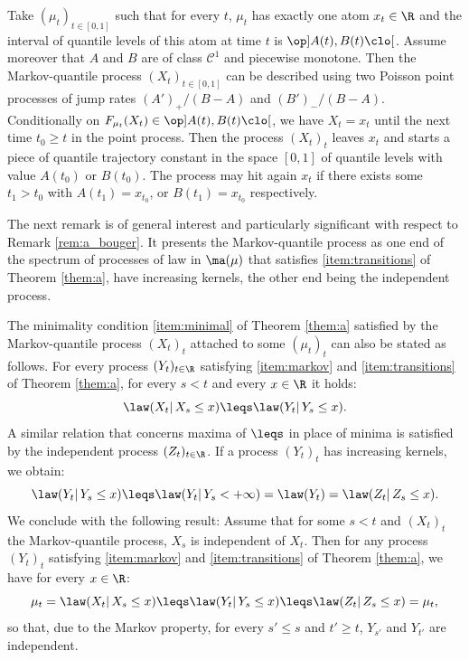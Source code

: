 
\begin{ex}\label{ex:swimming_atom}
Take $(\mu_t)_{t\in{[0,1]}}$ such that for every $t$, $\mu_t$ has exactly one atom $x_t\in \R$ and the interval of quantile levels of this atom at time $t$ is $\op]A(t),B(t)\clo[$. Assume moreover that $A$ and $B$ are of class $\mathcal{C}^1$ and piecewise monotone. Then the Markov-quantile process $(X_t)_{t\in [0,1]}$ can be described using two Poisson point processes of jump rates $(A')_+/(B-A)$ and $(B')_-/(B-A)$. Conditionally on $F_{\mu_t}(X_t)\in \op]A(t), B(t)\clo[$, we have $X_t=x_t$ until the next time $t_0\geq t$ in the point process. Then the process $(X_t)_t$ leaves $x_t$ and starts a piece of quantile trajectory constant in the space $[0,1]$ of quantile levels with value $A(t_0)$ or $B(t_0)$. The process may hit again $x_t$ if there exists some $t_1>t_0$ with $A(t_1)=x_{t_0}$, or $B(t_1)=x_{t_0}$ respectively.
\end{ex}

The next remark is of general interest and particularly significant with respect to Remark \ref{rem:a_bouger}. It presents the Markov-quantile process as one end of the spectrum of processes of law in $\ma(\mu)$ that satisfies \eqref{item:transitions} of Theorem \ref{them:a}, \ie have increasing kernels, the other end being the independent process.

\begin{rem}\label{rem:a_bouger}
The minimality condition \eqref{item:minimal} of Theorem \ref{them:a} satisfied by the Markov-quantile process $(X_t)_t$ attached to some $(\mu_t)_t$ can also be stated as follows. For every process $(Y_t)_{t\in \R}$ satisfying \eqref{item:markov} and \eqref{item:transitions} of Theorem \ref{them:a}, for every $s<t$ and every $x\in \R$ it holds:
\[
\law(X_t|\,X_s\leq x)\leqs \law(Y_t|\,Y_s\leq x).
\]
A similar relation that concerns maxima of $\leqs$ in place of minima is satisfied by the independent process $(Z_t)_{t\in \R}$. If a process $(Y_t)_t$ has increasing kernels, we obtain:
\[\law(Y_t|\,Y_s\leq x)\leqs \law(Y_t|\,Y_s< +\infty)=\law(Y_t)=\law(Z_t|\,Z_s\leq x).\]
We conclude with the following result: Assume that for some $s<t$ and $(X_t)_t$ the Markov-quantile process, $X_s$ is independent of $X_t$. Then for any process $(Y_t)_t$ satisfying \eqref{item:markov} and \eqref{item:transitions} of Theorem \ref{them:a}, we have for every $x\in\R$:\vspace*{-3pt}
\[
\mu_t=\law(X_t|\,X_s\leq x)\leqs \law(Y_t|\,Y_s\leq x) \leqs \law(Z_t|\,Z_s\leq x)=\mu_t,
\]
so that, due to the Markov property, for every $s'\leq s$ and $t'\geq t$, $Y_{s'}$ and $Y_{t'}$ are independent.
\end{rem}

